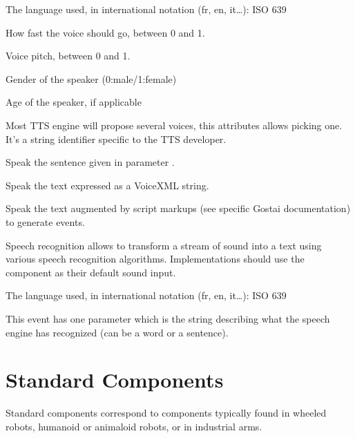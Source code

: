 \begin{slots}
  {%
    The language used, in international notation (fr, en, it…): ISO
    639%
  }

  {%
    How fast the voice should go, between 0 and 1.%
  }

  {%
    Voice pitch, between 0 and 1.%
  }

  {%
    Gender of the speaker (0:male/1:female)%
  }

  {%
    Age of the speaker, if applicable%
  }

  {%
    Most TTS engine will propose several voices, this attributes
    allows picking one. It's a string identifier specific to the TTS
    developer.%
  }

  {%
    Speak the sentence given in parameter .%
  }

  {%
    Speak the text  expressed as a VoiceXML string.%
  }

  {%
    Speak the text  augmented by script markups (see specific
    Gostai documentation) to generate \urbi events.%
  }

\end{slots}



Speech recognition allows to transform a stream of sound into a text
using various speech recognition algorithms. Implementations
should use the  component as their default sound input.

\begin{slots}
  {%
    The language used, in international notation (fr, en, it…): ISO
    639%
  }
\end{slots}

\begin{events}
  {%
    This event has one parameter which is the string describing what
    the speech engine has recognized (can be a word or a sentence).%
  }
\end{events}

\section{Standard Components}

Standard components correspond to components typically found in wheeled
robots, humanoid or animaloid robots, or in industrial arms.

